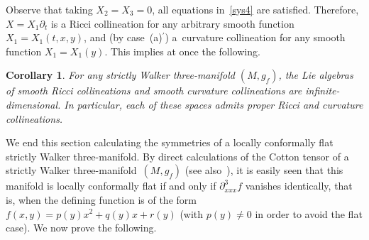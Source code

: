 \documentclass[10pt,a4paper]{amsart}
\numberwithin{equation}{section}
\newtheorem{Corollary}[Theorem]{Corollary}
 { \theoremstyle{definition}
\newtheorem{Remark}[Theorem]{Remark} }
\begin{document}
Observe that taking $X_2=X_3=0$, all equations in~\eqref{sys4} are satisf\/ied. Therefore, $X=X_1 \partial_{t}$ is a Ricci collineation for any arbitrary smooth function $X_1=X_1(t,x,y)$, and (by case~(a)$^\prime$) a~curvature collineation for any smooth function $X_1=X_1(y)$. This implies at once the following.

\begin{Corollary}
For any strictly Walker three-manifold $(M,g_f)$, the Lie algebras of smooth Ricci collineations and smooth curvature collineations are infinite-dimensional. In particular, each of these spaces admits proper Ricci and curvature collineations.
\end{Corollary}

We end this section calculating the symmetries of a locally conformally f\/lat strictly Walker three-manifold. By direct calculations of the Cotton tensor of a strictly Walker three-mani\-fold~$(M,g_f)$ (see also~\cite{ChGRVA}), it is easily seen that this manifold is locally conformally f\/lat if and only if $\partial_{xxx}^3f$ vanishes identically, that is, when the def\/ining function is of the form $f(x,y)=p(y)x^2+q(y)x+r(y)$ (with $p(y) \neq 0$ in order to avoid the f\/lat case). We now prove the following.
\end{document}
